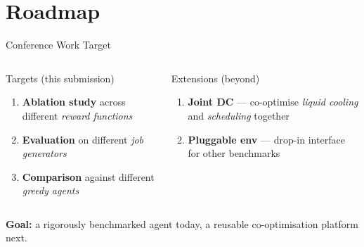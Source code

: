 
\section{Roadmap}

\begin{frame}{Conference Work Target}
  \begin{columns}[T,onlytextwidth]
      \begin{block}{Targets (this submission)}
        \begin{minipage}[t][3cm]{\linewidth}
        \begin{enumerate}
          \item \textbf{Ablation study} across different \emph{reward functions}
          \item \textbf{Evaluation} on different \emph{job generators}
          \item \textbf{Comparison} against different \emph{greedy agents}
        \end{enumerate}
        \end{minipage}
      \end{block}

      \begin{alertblock}{Extensions (beyond)}
        \begin{minipage}[t][3cm]{\linewidth}
        \begin{enumerate}
          \item \textbf{Joint DC} --- co-optimise \emph{liquid cooling} and \emph{scheduling} together
          \item \textbf{Pluggable env} --- drop-in interface for other benchmarks
        \end{enumerate}
        \end{minipage}
      \end{alertblock}
  \end{columns}

  \vspace{0.6em}
  \centering
  \small\textcolor{DeepBlue}{\textbf{Goal:}} a rigorously benchmarked agent today, a reusable co-optimisation platform next.
\end{frame}
